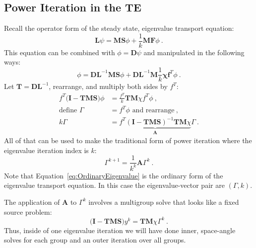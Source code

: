 \documentclass[12pt]{article}
\newcommand{\ve}[1]{\ensuremath{\mathbf{#1}}}
\begin{document}
\subsection*{Power Iteration in the TE}
Recall the operator form of the steady state, eigenvalue transport equation:
\[
\mathbf{L} \psi = \mathbf{MS}\phi +\frac{1}{k}\mathbf{MF}\phi \:.
\]
This equation can be combined with $\phi = \mathbf{D} \psi$ and manipulated in the following ways:
%
\begin{equation}
  \phi = \ve{DL}^{-1}\ve{MS}\phi + \ve{DL}^{-1}\ve{M}\frac{1}{k}\ve{\chi} \ve{f}^{T} \phi \:.
\end{equation}
%
Let $\ve{T} = \ve{DL}^{-1}$, rearrange, and multiply both sides by $f^{T}$:
\begin{align}
  f^{T}\bigl(\ve{I} - \ve{TMS}\bigr)\phi &= \frac{f^{T}}{k} \ve{TM}\chi f^{T} \phi \:, \label{eq:OperatorEvalForm} \\
  \text{define } \Gamma &= f^{T}\phi  \text{ and rearrange} \:, \nonumber \\
  k \Gamma &= \underbrace{f^{T}(\ve{I} - \ve{TMS})^{-1} \ve{TM} \chi}_{\ve{A}} \Gamma \:. \label{eq:OrdinaryEigenvalue}
\end{align}
%
All of that can be used to make the traditional form of power iteration where the eigenvalue iteration index is $k$:
%
\begin{equation}
  \Gamma^{k+1} =  \frac{1}{k^{k}}\ve{A} \Gamma^{k} \:.
\label{eq:PowerItForm} 
\end{equation}
Note that Equation~\eqref{eq:OrdinaryEigenvalue} is the ordinary form of the eigenvalue transport equation. In this case the eigenvalue-vector pair are $(\Gamma, k)$. 

The application of $\ve{A}$ to $\Gamma^{k}$ involves a multigroup solve that looks like a fixed source problem:
%
\begin{equation}
  \bigl(\ve{I} - \ve{TMS}\bigr)y^{k} = \ve{TM}\chi \Gamma^{k} \:.
\end{equation}
%
Thus, inside of one eigenvalue iteration we will have done inner, space-angle solves for each group and an outer iteration over all groups. 
\end{document}
